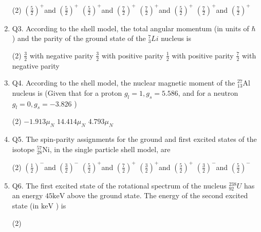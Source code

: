 \begin{enumerate}
	{}
 \begin{tasks}(2)
	\task[\textbf{a.}]$\left(\frac{5}{2}\right)^{+}$and $\left(\frac{5}{2}\right)^{+}$
	\task[\textbf{b.}]$\left(\frac{5}{2}\right)^{+}$and $\left(\frac{7}{2}\right)^{+}$
	\task[\textbf{c.}]$\left(\frac{7}{2}\right)^{+}$and $\left(\frac{5}{2}\right)^{+}$
	\task[\textbf{d.}] $\left(\frac{7}{2}\right)^{+}$and $\left(\frac{7}{2}\right)^{+}$
\end{tasks}
	\item Q3. According to the shell model, the total angular momentum (in units of $\hbar$ ) and the parity of the ground state of the ${ }_3^7 L i$ nucleus is
	{}
 \begin{tasks}(2)
	\task[\textbf{a.}]$\frac{3}{2}$ with negative parity
	\task[\textbf{b.}]$\frac{3}{2}$ with positive parity
	\task[\textbf{c.}]$\frac{1}{2}$ with positive parity
	\task[\textbf{d.}] $\frac{7}{2}$ with negative parity
\end{tasks}
	\item Q4. According to the shell model, the nuclear magnetic moment of the ${ }_{13}^{27} \mathrm{Al}$ nucleus is (Given that for a proton $g_l=1, g_s=5.586$, and for a neutron $g_l=0, g_s=-3.826$ )
	{}
 \begin{tasks}(2)
	\task[\textbf{a.}] $-1.913 \mu_N$
	\task[\textbf{b.}] $14.414 \mu_N$
	\task[\textbf{c.}]$4.793 \mu_N$
\end{tasks}
	\item Q5. The spin-parity assignments for the ground and first excited states of the isotope ${ }_{28}^{57} \mathrm{Ni}$, in the single particle shell model, are
	{}
 \begin{tasks}(2)
	\task[\textbf{a.}]$\left(\frac{1}{2}\right)^{-}$and $\left(\frac{3}{2}\right)^{-}$
	\task[\textbf{b.}] $\left(\frac{5}{2}\right)^{+}$and $\left(\frac{7}{2}\right)^{+}$
	\task[\textbf{c.}]$\left(\frac{3}{2}\right)^{+}$and $\left(\frac{5}{2}\right)^{+}$
	\task[\textbf{d.}] $\left(\frac{3}{2}\right)^{-}$and $\left(\frac{5}{2}\right)^{-}$
\end{tasks}
	\item Q6. The first excited state of the rotational spectrum of the nucleus ${ }_{92}^{238} U$ has an energy $45 \mathrm{keV}$ above the ground state. The energy of the second excited state (in $\mathrm{keV}$ ) is
	{}
 \begin{tasks}(2)

\end{tasks}
\end{enumerate}
